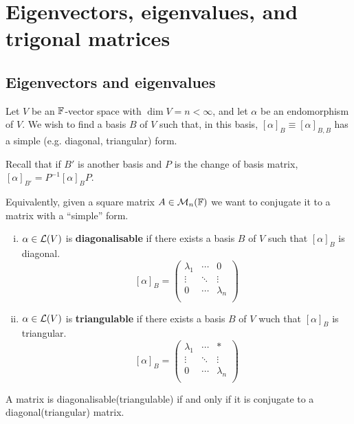 \documentclass[a4paper,11pt]{article}
\begin{document}
\section{Eigenvectors, eigenvalues, and trigonal matrices}
\subsection{Eigenvectors and eigenvalues}
Let $ V $ be an $ {\mathbb{F}} $-vector space with $ \dim V = n < \infty $, and let $ \alpha $ be an endomorphism of $ V $.
We wish to find a basis $ B $ of $ V $ such that, in this basis, $ [\alpha]_B \equiv [\alpha]_{B,B} $ has a simple (e.g. diagonal, triangular) form.

Recall that if $ B' $ is another basis and $ P $ is the change of basis matrix, $ [\alpha]_{B'} = P^{-1} [\alpha]_B P $.

Equivalently, given a square matrix $ A \in {\mathcal{M}}_n({\mathbb{F}}) $ we want to conjugate it to a matrix with a ``simple'' form. 

\begin{definition}
	\begin{enumerate}[(i)]
		\item $ \alpha\in {\mathcal{L}}(V) $ is \textbf{diagonalisable} if there exists a basis $B$ of $V$ such that $ [\alpha]_{B} $ is diagonal. 
		\[
			[\alpha]_B = \begin{pmatrix}
				\lambda_1 & \cdots &  0 \\
				\vdots  & \ddots  &  \vdots  \\
				0 & \cdots  &  \lambda_n \\
			\end{pmatrix}
		\]
		\item $ \alpha\in {\mathcal{L}}(V) $ is \textbf{triangulable} if there exists a basis $B$ of $V$ wuch that $ [\alpha]_B $ is triangular.
		\[
			[\alpha]_B = \begin{pmatrix}
				\lambda_1 & \cdots &  * \\
				\vdots  & \ddots  &  \vdots  \\
				0 & \cdots  &  \lambda_n \\
			\end{pmatrix}
		\]
	\end{enumerate}
\end{definition}

\begin{remark}
	A matrix is diagonalisable(triangulable) if and only if it is conjugate to a diagonal(triangular) matrix. 
\end{remark}
\end{document}

